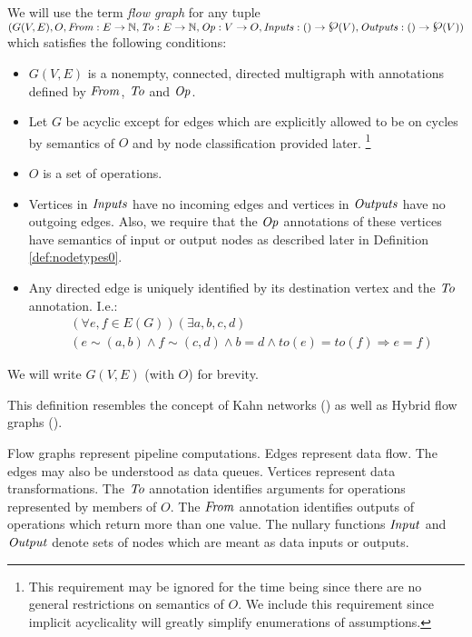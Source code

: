   We will use the term \emph{flow graph} for any tuple $(G(V, E), O, \mf{from}:E \arrow \N, \mf{to}:E \arrow \N, \mf{op}:V \arrow O, \mf{inputs}: {() \arrow \powerset(V)}, \\{\mf{outputs}: () \arrow \powerset(V))}$ which satisfies the following conditions:
\begin{itemize}
  \item $G(V,E)$ is a nonempty, connected, directed multigraph with annotations defined by $\mf{from}$, $\mf{to}$ and $\mf{op}$.  
  \item Let $G$ be acyclic except for edges which are explicitly allowed to be on cycles by semantics of $O$ and by node classification provided later. \footnote{This requirement may be ignored for the time being since there are no general restrictions on semantics of $O$. We include this requirement since implicit acyclicality will greatly simplify enumerations of assumptions.}
  \item $O$ is a set of operations.
  \item Vertices in $\mf{inputs}$ have no incoming edges and vertices in $\mf{outputs}$ have no outgoing edges. Also, we require that the $\mf{op}$ annotations of these vertices have semantics of input or output nodes as described later in Definition \ref{def:nodetypes0}.
  \item Any directed edge is uniquely identified by its destination vertex and the $\mf{to}$ annotation. I.e.:
    \begin{align*} &(\forall{e,f \in E(G)})(\exists a,b,c,d) \\ &(e \sim (a,b) \land f \sim (c,d) \land b = d \land to(e) = to(f) \Rightarrow e = f )\end{align*}
\end {itemize}
    We will write $G(V,E)$ (with $O$) for brevity.
\myenddef

    This definition resembles the concept of Kahn networks (\cite{kahn}) as well as Hybrid flow graphs (\cite{hfg}).

    Flow graphs represent pipeline computations. Edges represent data flow. The edges may also be understood as data queues. Vertices represent data transformations. The $\mf{to}$ annotation identifies arguments for operations represented by members of $O$. The $\mf{from}$ annotation identifies outputs of operations which return more than one value. The nullary functions $\mf{input}$ and $\mf{output}$ denote sets of nodes which are meant as data inputs or outputs.


